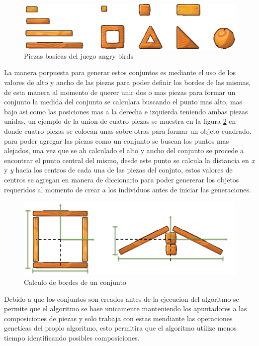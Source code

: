 \begin{figure}
  \centering
  \includegraphics[width=1.0\textwidth]{img/list_pieces.png}
  \caption{Piezas basicas del juego angry birds}
  \label{figure:game-basic-blocks}
\end{figure}

La manera porpuesta para generar estos conjuntos es mediante el uso de los
valores de alto y ancho de las piezas para poder definir los bordes de las
mismas, de esta manera al momento de querer unir dos o mas piezas para formar un
conjunto la medida del conjunto se calculara buscando el punto mas alto, mas
bajo asi como las posiciones mas a la derecha e izquierda teniendo ambas piezas
unidas, un ejemplo de la union de cuatro piezas se muestra en la figura
\ref{figure:bounding-box-calculation} en donde cuatro piezas se colocan unas
sobre otras para formar un objeto cuadrado, para poder agregar las piezas como
un conjunto se buscan los puntos mas alejados, una vez que se ah calculado el
alto y ancho del conjunto se procede a encontrar el punto central del mismo,
desde este punto se calcula la distancia en \textit{x} y \textit{y} hacia los
centros de cada una de las piezas del conjnto, estos valores de centros se
agregan en manera de diccionario para poder genererar los objetos requeridos al
momento de crear a los individuos antes de iniciar las generaciones.

\begin{figure}
  \centering
  \includegraphics[width=1.0\textwidth]{img/bounding_box_calculation.png}
  \caption{Calculo de bordes de un conjunto}
  \label{figure:bounding-box-calculation}
\end{figure}

Debido a que los conjuntos son creados antes de la ejecucion del algoritmo se
permite que el algoritmo se base unicamente manteniendo los apuntadores a las
composiciones de piezas y solo trabaja con estas mendiante las operaciones
geneticas del propio algoritmo, esto permitira que el algoritmo utilize menos
tiempo identificando posibles composiciones.


